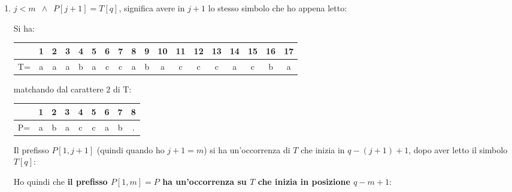 \begin{enumerate}
  \item $j<m\,\,\,\land\,\,\,P[j+1]=T[q]$, significa avere in $j+1$ lo stesso
  simbolo che ho appena letto:
  \begin{esempio}
    Si ha:
    \begin{table}[H]
      \centering
      \begin{tabular}{c||c|c|c|c|c|c|c|c|c|c|c|c|c|c|c|c|c}
        \hline
        & 1 & 2 & 3 & 4 & 5 & 6 & 7 & 8 & 9 & 10 & 11 & 12 & 13 &14&15&16&17\\
        \hline
        T=&a& a & a& b& a& c &c &a &b &a&c&c&c&a &c &b &a\\
        \hline
      \end{tabular}
    \end{table}
    matchando dal carattere 2 di T:
    \begin{table}[H]
      \centering
      \begin{tabular}{c||c|c|c|c|c|c|c|c}
        \hline
        & 1 & 2 & 3 & 4 & 5 & 6 & 7 &8\\
        \hline
        P=&a& b & a& c& c& a &b &. \\
        \hline
      \end{tabular}
    \end{table}

  \end{esempio}
  Il prefisso $P[1,j+1]$ (quindi quando ho $j+1=m$) si ha un'occorrenza di $T$
  che inizia in $q-(j+1)+1$, dopo aver letto il simbolo $T[q]$:
  \begin{center}
  \end{center}
  Ho quindi che \textbf{il prefisso $P[1,m]=P$ ha un'occorrenza su $T$ che
    inizia in posizione $q-m+1$}:
  \begin{center}
  \end{center}
  

\end{enumerate}
